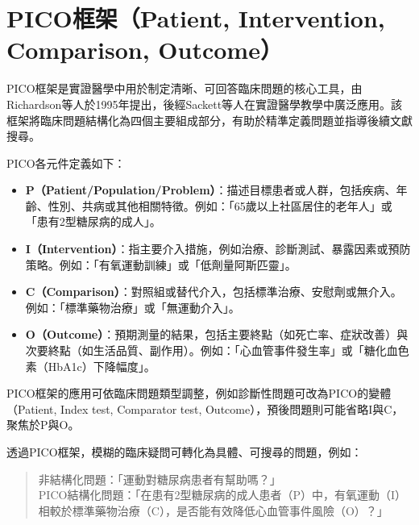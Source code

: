 
\section{PICO框架（Patient, Intervention, Comparison, Outcome）}

PICO框架是實證醫學中用於制定清晰、可回答臨床問題的核心工具，由Richardson等人於1995年提出，後經Sackett等人在實證醫學教學中廣泛應用。該框架將臨床問題結構化為四個主要組成部分，有助於精準定義問題並指導後續文獻搜尋。

PICO各元件定義如下：
\begin{itemize}
    \item \textbf{P（Patient/Population/Problem）}：描述目標患者或人群，包括疾病、年齡、性別、共病或其他相關特徵。例如：「65歲以上社區居住的老年人」或「患有2型糖尿病的成人」。
    \item \textbf{I（Intervention）}：指主要介入措施，例如治療、診斷測試、暴露因素或預防策略。例如：「有氧運動訓練」或「低劑量阿斯匹靈」。
    \item \textbf{C（Comparison）}：對照組或替代介入，包括標準治療、安慰劑或無介入。例如：「標準藥物治療」或「無運動介入」。
    \item \textbf{O（Outcome）}：預期測量的結果，包括主要終點（如死亡率、症狀改善）與次要終點（如生活品質、副作用）。例如：「心血管事件發生率」或「糖化血色素（HbA1c）下降幅度」。
\end{itemize}

PICO框架的應用可依臨床問題類型調整，例如診斷性問題可改為PICO的變體（Patient, Index test, Comparator test, Outcome），預後問題則可能省略I與C，聚焦於P與O。

透過PICO框架，模糊的臨床疑問可轉化為具體、可搜尋的問題，例如：
\begin{quote}
    非結構化問題：「運動對糖尿病患者有幫助嗎？」\\
    PICO結構化問題：「在患有2型糖尿病的成人患者（P）中，有氧運動（I）相較於標準藥物治療（C），是否能有效降低心血管事件風險（O）？」
\end{quote}

